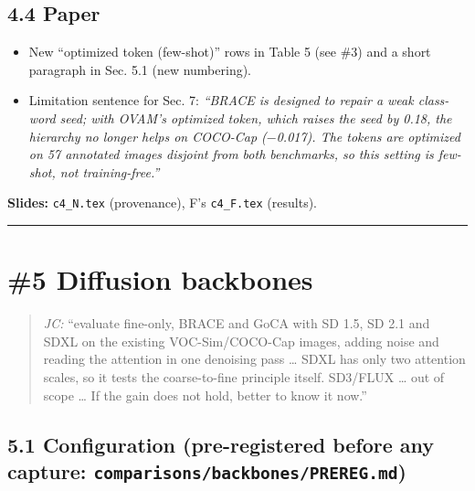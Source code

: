 \documentclass[
  10pt,
]{article}
\providecommand{\tightlist}{%
  \setlength{\itemsep}{0pt}\setlength{\parskip}{0pt}}
\begin{document}
\subsection{4.4 Paper}

\begin{itemize}
\tightlist
\item
  New ``optimized token (few-shot)'' rows in Table 5 (see \#3) and a
  short paragraph in Sec. 5.1 (new numbering).
\item
  Limitation sentence for Sec. 7: \emph{``BRACE is designed to repair a
  weak class-word seed; with OVAM's optimized token, which raises the
  seed by 0.18, the hierarchy no longer helps on COCO-Cap (\ensuremath{-}0.017). The
  tokens are optimized on 57 annotated images disjoint from both
  benchmarks, so this setting is few-shot, not training-free.''}
\end{itemize}

\textbf{Slides:} \texttt{c4\_N.tex} (provenance), F's \texttt{c4\_F.tex}
(results).

\begin{center}\rule{0.5\linewidth}{0.5pt}\end{center}

\section{\#5 Diffusion backbones}

\begin{quote}
\emph{JC:} ``evaluate fine-only, BRACE and GoCA with SD 1.5, SD 2.1 and
SDXL on the existing VOC-Sim/COCO-Cap images, adding noise and reading
the attention in one denoising pass \ldots{} SDXL has only two attention
scales, so it tests the coarse-to-fine principle itself. SD3/FLUX
\ldots{} out of scope \ldots{} If the gain does not hold, better to know
it now.''
\end{quote}

\subsection{\texorpdfstring{5.1 Configuration (pre-registered before any
capture:
\texttt{comparisons/backbones/PREREG.md})}{5.1 Configuration (pre-registered before any capture: comparisons/backbones/PREREG.md)}}
\end{document}
